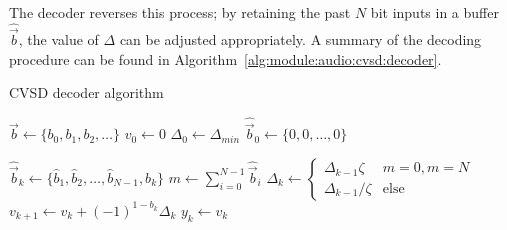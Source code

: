 The decoder reverses this process;
by retaining the past $N$ bit inputs in a buffer $\hat{\vec{b}}$,
the value of $\Delta$ can be adjusted appropriately.
A summary of the decoding procedure can be found in
Algorithm~\ref{alg:module:audio:cvsd:decoder}.
%
\begin{algorithm}[H]
\caption{CVSD decoder algorithm}
\label{alg:module:audio:cvsd:decoder}
\begin{algorithmic}[1]
\STATE $\vec{b} \leftarrow \{b_0,b_1,b_2,\ldots\}$  
\STATE $v_0 \leftarrow 0$                           
\STATE $\Delta_0 \leftarrow \Delta_{min}$           
\STATE $\hat{\vec{b}}_0 \leftarrow \{0,0,\ldots,0\}$

    \STATE $\hat{\vec{b}}_k \leftarrow  \{\hat{b}_1,\hat{b}_2,\ldots,\hat{b}_{N-1},b_k\}$
    \STATE $m \leftarrow \sum_{i=0}^{N-1}{\hat{\vec{b}}_i}$
    \STATE $\Delta_k \leftarrow \begin{cases}\Delta_{k-1}\zeta & m = 0, m=N \\ \Delta_{k-1}/\zeta & \text{else}\end{cases}$
    \STATE $v_{k+1} \leftarrow v_k + (-1)^{1-b_k} \Delta_k$
    \STATE $y_k \leftarrow v_k$
\ENDFOR
\end{algorithmic}
\end{algorithm}
%

%
